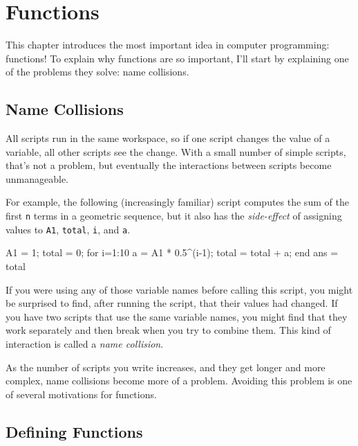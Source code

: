 \chapter{Functions}
\label{functions}

This chapter introduces the most important idea in computer programming: functions! 
To explain why functions are so important, I'll start by explaining one of the problems they solve: name collisions.


\section{Name Collisions}
\label{collision}


All scripts run in the same workspace, so if one script changes the value of a variable, all other scripts see the change.  With a small number of simple scripts, that's not a problem, but eventually the interactions between scripts become unmanageable.

For example, the following (increasingly familiar) script computes the
sum of the first {\tt n} terms in a geometric sequence, but it also
has the {\em side-effect} of assigning values to {\tt A1}, {\tt total},
{\tt i}, and {\tt a}.

\begin{code}
A1 = 1;
total = 0;
for i=1:10
    a = A1 * 0.5^(i-1);
    total = total + a;
end
ans = total
\end{code}

If you were using any of those variable names before calling this
script, you might be surprised to find, after running the script,
that their values had changed.  If you have two scripts that use
the same variable names, you might find that they work separately
and then break when you try to combine them.  This kind of
interaction is called a \emph{name collision}.


As the number of scripts you write increases, and they get longer
and more complex, name collisions become more of a problem.  Avoiding
this problem is one of several motivations for functions.

\section{Defining Functions}

